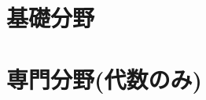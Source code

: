 \documentclass[twocolumn]{jbook}
\theoremstyle{definition}
\newcounter{studyhint}
\begin{document}
\part{基礎分野}




\part{専門分野(代数のみ)}








%
%

{\small
}
\end{document}
